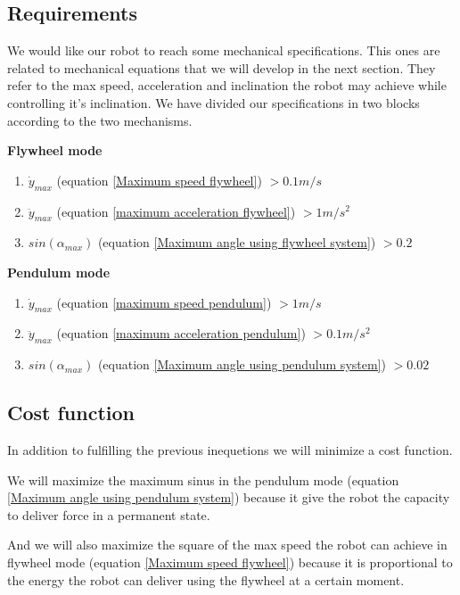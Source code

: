 \subsection{Requirements}
We would like our robot to reach some mechanical specifications. This ones are related to mechanical equations
that we will develop in the next section. They refer to the max speed, acceleration and inclination the robot may achieve
while controlling it's inclination. We have divided our specifications in two blocks
according to the two mechanisms.

\textbf{Flywheel mode}
\begin{enumerate}
	\item $\dot{y}_{max}$ (equation \ref{Maximum speed flywheel}) $> 0.1m/s$
	\item $\ddot{y}_{max}$ (equation \ref{maximum acceleration flywheel}) $> 1m/s^2$
	\item $sin(\alpha_{max})$ (equation \ref{Maximum angle using flywheel system}) $>0.2$
\end{enumerate}

\textbf{Pendulum mode}
\begin{enumerate}
	\item $\dot{y}_{max}$ (equation \ref{maximum speed pendulum}) $>1m/s$
	\item $\ddot{y}_{max}$ (equation \ref{maximum acceleration pendulum}) $>0.1m/s^2$
	\item $sin(\alpha_{max})$ (equation \ref{Maximum angle using pendulum system}) $> 0.02$
\end{enumerate}
	


\subsection{Cost function}
In addition to fulfilling the previous inequetions we will
minimize a cost function.

We will maximize the maximum sinus in the pendulum mode 
(equation \ref{Maximum angle using pendulum system}) because
it give the robot the capacity to deliver force in a permanent state.

And we will also maximize the square of the max speed the robot can achieve
in flywheel mode (equation \ref{Maximum speed flywheel}) because it is
proportional to the energy the robot can deliver using the flywheel at a certain moment.

